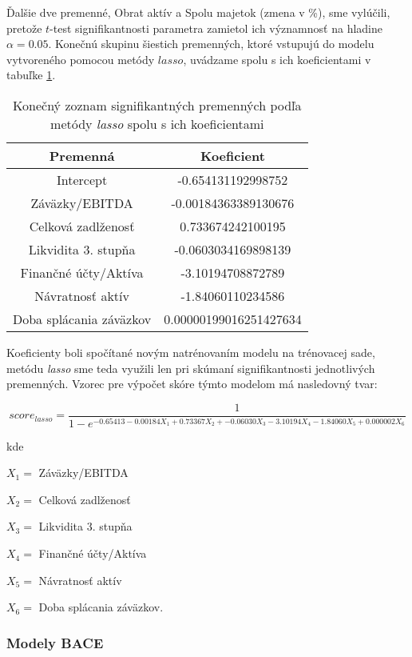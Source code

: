 Ďalšie dve premenné, Obrat aktív a Spolu majetok (zmena v \%), sme vylúčili, pretože \(t\)-test signifikantnosti parametra zamietol ich významnosť na hladine \(\alpha = 0.05\).
Konečnú skupinu šiestich premenných, ktoré vstupujú do modelu vytvoreného pomocou metódy \(lasso\), uvádzame spolu s ich koeficientami v tabuľke \ref{lasso tabulka konecne parametre}.

\begin{table}
    \begin{tabular}{ |c|c| }
        \hline
        Premenná & Koeficient \\
        \hline
        Intercept & -0.654131192998752 \\
        \hline
        Záväzky/EBITDA & -0.00184363389130676 \\
        \hline
        Celková zadlženosť & 0.733674242100195 \\
        \hline
        Likvidita 3. stupňa & -0.0603034169898139 \\
        \hline
        Finančné účty/Aktíva & -3.10194708872789 \\
        \hline
        Návratnosť aktív & -1.84060110234586 \\
        \hline
        Doba splácania záväzkov & 0.00000199016251427634 \\
        \hline
    \end{tabular}
    \caption{Konečný zoznam signifikantných premenných podľa metódy \emph{lasso} spolu s ich koeficientami}
    \label{lasso tabulka konecne parametre}
\end{table}

Koeficienty boli spočítané novým natrénovaním modelu na trénovacej sade,
metódu \emph{lasso} sme teda využili len pri skúmaní signifikantnosti jednotlivých premenných.
Vzorec pre výpočet skóre týmto modelom má nasledovný tvar:

\[
    {score}_{lasso} = \frac{1}{1 - e^{-0.65413 - 0.00184X_1 + 0.73367X_2 + -0.06030X_3 - 3.10194X_4 - 1.84060X_5 + 0.000002X_6}}
\]

kde

\(X_1 = \) Záväzky/EBITDA

\(X_2 = \) Celková zadlženosť

\(X_3 = \) Likvidita 3. stupňa

\(X_4 = \) Finančné účty/Aktíva

\(X_5 = \) Návratnosť aktív

\(X_6 = \) Doba splácania záväzkov.

\subsubsection{Modely BACE}

